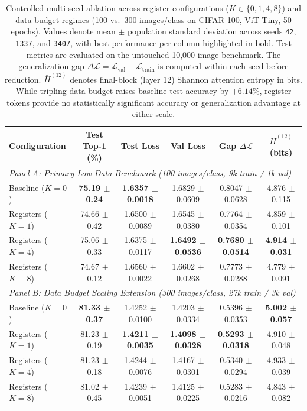 \begin{table}[t]
\centering
\caption{Controlled multi-seed ablation across register configurations ($K \in \{0, 1, 4, 8\}$) and data budget regimes (100 vs.\ 300 images/class on CIFAR-100, ViT-Tiny, 50 epochs). Values denote mean $\pm$ population standard deviation across seeds \texttt{42}, \texttt{1337}, and \texttt{3407}, with best performance per column highlighted in bold. Test metrics are evaluated on the untouched 10{,}000-image benchmark. The generalization gap $\Delta\mathcal{L} = \mathcal{L}_{\mathrm{val}} - \mathcal{L}_{\mathrm{train}}$ is computed within each seed before reduction. $\bar{H}^{(12)}$ denotes final-block (layer 12) Shannon attention entropy in bits. While tripling data budget raises baseline test accuracy by $+6.14\%$, register tokens provide no statistically significant accuracy or generalization advantage at either scale.}
\label{tab:main_results}
\setlength{\tabcolsep}{6pt}
\footnotesize
\begin{tabular}{lccccc}
\toprule
\textbf{Configuration} & \textbf{Test Top-1 (\%)} & \textbf{Test Loss} & \textbf{Val Loss} & \textbf{Gap $\Delta\mathcal{L}$} & \textbf{$\bar{H}^{(12)}$ (bits)} \\
\midrule
\multicolumn{6}{l}{\textit{Panel A: Primary Low-Data Benchmark (100 images/class, 9k train / 1k val)}} \\
\midrule
Baseline ($K=0$) & \textbf{75.19 $\pm$ 0.24} & \textbf{1.6357 $\pm$ 0.0018} & 1.6829 $\pm$ 0.0609 & 0.8047 $\pm$ 0.0628 & 4.876 $\pm$ 0.115 \\
Registers ($K=1$) & 74.66 $\pm$ 0.42 & 1.6500 $\pm$ 0.0089 & 1.6545 $\pm$ 0.0380 & 0.7764 $\pm$ 0.0354 & 4.859 $\pm$ 0.101 \\
Registers ($K=4$) & 75.06 $\pm$ 0.33 & 1.6375 $\pm$ 0.0117 & \textbf{1.6492 $\pm$ 0.0536} & \textbf{0.7680 $\pm$ 0.0514} & \textbf{4.914 $\pm$ 0.031} \\
Registers ($K=8$) & 74.67 $\pm$ 0.12 & 1.6560 $\pm$ 0.0022 & 1.6602 $\pm$ 0.0268 & 0.7773 $\pm$ 0.0288 & 4.779 $\pm$ 0.091 \\
\midrule
\multicolumn{6}{l}{\textit{Panel B: Data Budget Scaling Extension (300 images/class, 27k train / 3k val)}} \\
\midrule
Baseline ($K=0$) & \textbf{81.33 $\pm$ 0.37} & 1.4252 $\pm$ 0.0100 & 1.4203 $\pm$ 0.0334 & 0.5396 $\pm$ 0.0353 & \textbf{5.002 $\pm$ 0.057} \\
Registers ($K=1$) & 81.23 $\pm$ 0.19 & \textbf{1.4211 $\pm$ 0.0035} & \textbf{1.4098 $\pm$ 0.0328} & \textbf{0.5293 $\pm$ 0.0318} & 4.910 $\pm$ 0.048 \\
Registers ($K=4$) & 81.23 $\pm$ 0.18 & 1.4244 $\pm$ 0.0076 & 1.4167 $\pm$ 0.0301 & 0.5340 $\pm$ 0.0294 & 4.933 $\pm$ 0.039 \\
Registers ($K=8$) & 81.02 $\pm$ 0.45 & 1.4239 $\pm$ 0.0051 & 1.4125 $\pm$ 0.0225 & 0.5283 $\pm$ 0.0216 & 4.843 $\pm$ 0.082 \\
\bottomrule
\end{tabular}
\end{table}
